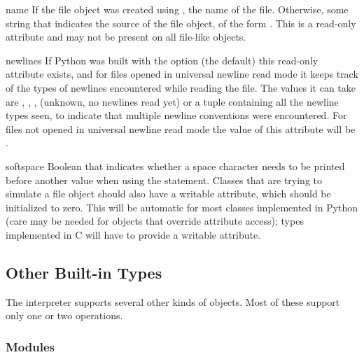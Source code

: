 \begin{memberdesc}[file]{name}
If the file object was created using , the name of
the file.  Otherwise, some string that indicates the source of the
file object, of the form \samp{<\mbox{\ldots}>}.  This is a read-only
attribute and may not be present on all file-like objects.
\end{memberdesc}

\begin{memberdesc}[file]{newlines}
If Python was built with the  option
(the default) this read-only attribute exists, and for files opened in
universal newline read mode it keeps track of the types of newlines
encountered while reading the file. The values it can take are
, , ,  (unknown,
no newlines read yet) or a tuple containing all the newline
types seen, to indicate that multiple
newline conventions were encountered. For files not opened in universal
newline read mode the value of this attribute will be .
\end{memberdesc}

\begin{memberdesc}[file]{softspace}
Boolean that indicates whether a space character needs to be printed
before another value when using the  statement.
Classes that are trying to simulate a file object should also have a
writable  attribute, which should be initialized to
zero.  This will be automatic for most classes implemented in Python
(care may be needed for objects that override attribute access); types
implemented in C will have to provide a writable
 attribute.
\end{memberdesc}


\subsection{Other Built-in Types \label{typesother}}

The interpreter supports several other kinds of objects.
Most of these support only one or two operations.


\subsubsection{Modules \label{typesmodules}}

